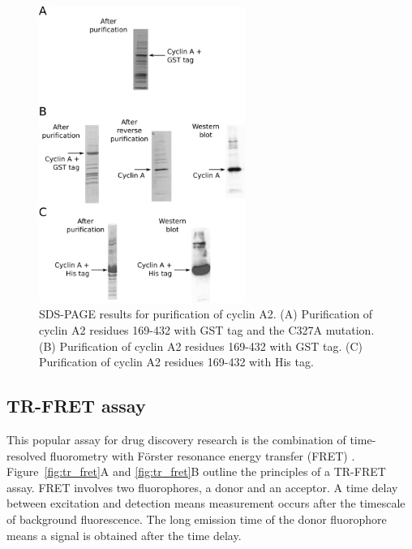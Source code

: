 \begin{figure}
\centering

\includegraphics[width=0.6\textwidth]{figures/purification/purification}

\caption[SDS-PAGE results for purification of cyclin A2]
{SDS-PAGE results for purification of cyclin A2.
(A) Purification of cyclin A2 residues 169-432 with GST tag and the C327A mutation.
(B) Purification of cyclin A2 residues 169-432 with GST tag.
(C) Purification of cyclin A2 residues 169-432 with His tag.}

\label{fig:purification}
\end{figure}


\subsection{TR-FRET assay}

This popular assay for drug discovery research is the combination of time-resolved fluorometry with F\"{o}rster resonance energy transfer (FRET) \cite{Comley2006}.
Figure~\ref{fig:tr_fret}A and \ref{fig:tr_fret}B outline the principles of a TR-FRET assay.
FRET involves two fluorophores, a donor and an acceptor.
A time delay between excitation and detection means measurement occurs after the timescale of background fluorescence.
The long emission time of the donor fluorophore means a signal is obtained after the time delay.

